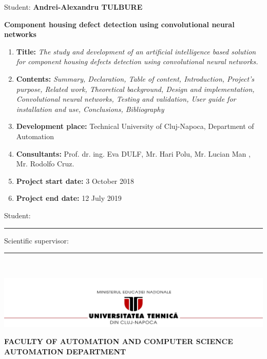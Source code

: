 \documentclass[12pt,a4paper,twoside]{report}
\renewcommand{\thesisauthor}{Andrei-Alexandru TULBURE}    %
\renewcommand{\thesistitle}{Component housing defect detection using convolutional neural networks} %
\newcommand{\department}{FACULTY OF AUTOMATION AND COMPUTER SCIENCE\\
AUTOMATION DEPARTMENT}
\newcommand{\uline}[1]{\rule[0pt]{#1}{0.4pt}}
\newcommand{\utcnlogo}{\includegraphics[width=15cm]{img/utcn.jpg}}
\begin{document}
\begin{center}
Student: {\bf \thesisauthor}

\vspace{1cm}

{\bf \thesistitle}
\end{center}

\vspace{5mm}

\begin{enumerate}
 \item {\bf Title:} {\it The study and development of an artificial intelligence based solution for component housing defects detection using convolutional neural networks.}
\item {\bf Contents:} {\it Summary, Declaration, Table of content, Introduction, Project's purpose, Related work, Theoretical background, Design and implementation, Convolutional neural networks, Testing and validation, User guide for installation and use, Conclusions, Bibliography}
\item {\bf Development place:}  Technical University of Cluj-Napoca, Department of Automation
\item {\bf Consultants:} Prof. dr. ing. Eva DULF, Mr. Hari Polu, Mr. Lucian Man , Mr. Rodolfo Cruz.
\item {\bf Project start date:} 3 October 2018
\item {\bf Project end date:} 12 July 2019
  \end{enumerate}
\vspace{1.2cm}

\hspace{6cm} Student: \uline{6cm} 

\vspace{0.5cm}

\hspace{6cm} Scientific supervisor: \uline{5cm} 

\thispagestyle{empty}


$ $


\thispagestyle{empty}
\newpage

\begin{center}
\utcnlogo

{\bf \department}
\end{center}

\vspace{0.5cm}
\end{document}

